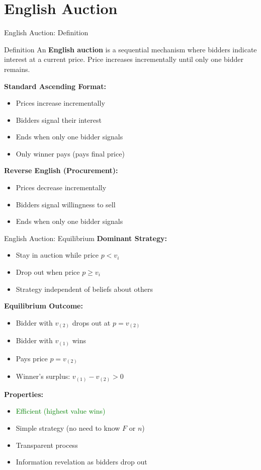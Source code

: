 \documentclass[xcolor={x11names}, aspectratio=169 ]{beamer}
\begin{document}
\section{English Auction}

\begin{frame}{English Auction: Definition}
\begin{block}{Definition}
An \textbf{English auction} is a sequential mechanism where bidders indicate interest at a current price. Price increases incrementally until only one bidder remains.
\end{block}

\textbf{Standard Ascending Format:}
\begin{itemize}
\item Prices increase incrementally
\item Bidders signal their interest
\item Ends when only one bidder signals
\item Only winner pays (pays final price)
\end{itemize}

\textbf{Reverse English (Procurement):}
\begin{itemize}
\item Prices decrease incrementally
\item Bidders signal willingness to sell
\item Ends when only one bidder signals
\end{itemize}
\end{frame}

\begin{frame}{English Auction: Equilibrium}
\textbf{Dominant Strategy:}
\begin{itemize}
  \item Stay in auction while price $p < v_i$
  \item Drop out when price $p \geq v_i$
  \item Strategy independent of beliefs about others
\end{itemize}

\textbf{Equilibrium Outcome:}
\begin{itemize}
  \item Bidder with $v_{(2)}$ drops out at $p = v_{(2)}$
  \item Bidder with $v_{(1)}$ wins
  \item Pays price $p = v_{(2)}$
  \item Winner's surplus: $v_{(1)} - v_{(2)} > 0$
\end{itemize}

\textbf{Properties:}
\begin{itemize}
  \item \textcolor{green}{Efficient (highest value wins)}
  \item Simple strategy (no need to know $F$ or $n$)
  \item Transparent process
  \item Information revelation as bidders drop out
\end{itemize}
\end{frame}
\end{document}
